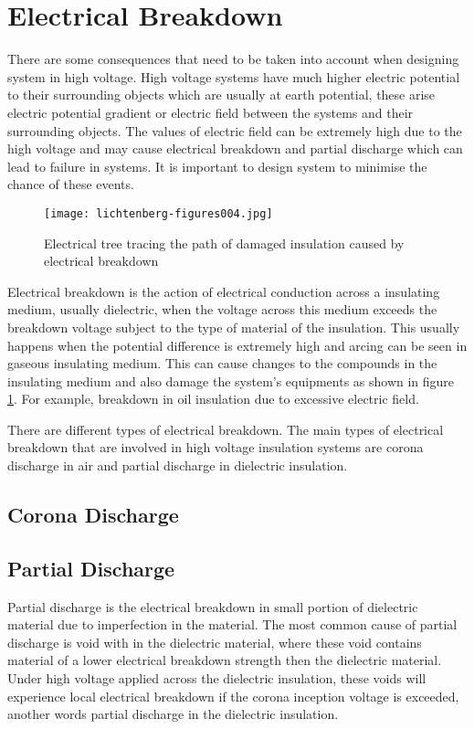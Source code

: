 \section{Electrical Breakdown} %
There are some consequences that need to be taken into account when designing system in high voltage. High voltage systems have much higher electric potential to their surrounding objects which are usually at earth potential, these arise electric potential gradient or electric field between the systems and their surrounding objects. The values of electric field can be extremely high due to the high voltage and may cause electrical breakdown and partial discharge which can lead to failure in systems. It is important to design system to minimise the chance of these events.
\begin{figure}[!h]
   \centering
   \texttt{[image: lichtenberg-figures004.jpg]}
   \caption{Electrical tree tracing the path of damaged insulation caused by electrical breakdown}
   \label{figure:breakdown}
\end{figure}
Electrical breakdown is the action of electrical conduction across a insulating medium, usually dielectric, when the voltage across this medium exceeds the breakdown voltage subject to the type of material of the insulation. This usually happens when the potential difference is extremely high and arcing can be seen in gaseous insulating medium. This can cause changes to the compounds in the insulating medium and also damage the system's equipments as shown in figure \ref{figure:breakdown}. For example, breakdown in oil insulation due to excessive electric field.

There are different types of electrical breakdown. The main types of electrical breakdown that are involved in high voltage insulation systems are corona discharge in air and partial discharge in dielectric insulation.

\subsection{Corona Discharge}

\subsection{Partial Discharge}
Partial discharge is the electrical breakdown in small portion of dielectric material due to imperfection in the material. The most common cause of partial discharge is void with in the dielectric material, where these void contains material of a lower electrical breakdown strength then the dielectric material. Under high voltage applied across the dielectric insulation, these voids will experience local electrical breakdown if the corona inception voltage is exceeded, another words partial discharge in the dielectric insulation.
